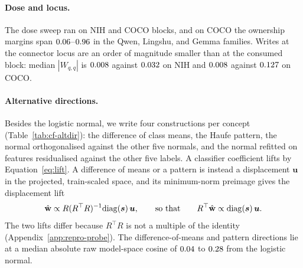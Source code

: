 \documentclass{article}
\begin{document}
\paragraph{Dose and locus.} The dose sweep ran on \cfDoseBlocksNih{} NIH and \cfDoseBlocksCoco{} COCO blocks, and on COCO the ownership margins span $0.06$--$0.96$ in the Qwen, Lingshu, and Gemma families. Writes at the connector locus are an order of magnitude smaller than at the consumed block: median $|W_{q,q}|$ is $0.008$ against $0.032$ on NIH and $0.008$ against $0.127$ on COCO.

\paragraph{Alternative directions.} Besides the logistic normal, we write four constructions per concept (Table~\ref{tab:cf-altdir}): the difference of class means, the Haufe pattern, the normal orthogonalised against the other five normals, and the normal refitted on features residualised against the other five labels. A classifier coefficient lifts by Equation~\ref{eq:lift}. A difference of means or a pattern is instead a displacement $\boldsymbol u$ in the projected, train-scaled space, and its minimum-norm preimage gives the displacement lift
\begin{equation}
\hat{\mathbf{w}}\propto R(R^{\top}R)^{-1}\mathrm{diag}(\boldsymbol s)\,\boldsymbol u,\qquad\text{so that}\qquad R^{\top}\hat{\mathbf{w}}\propto\mathrm{diag}(\boldsymbol s)\,\boldsymbol u .
\label{eq:displacement-lift}
\end{equation}
The two lifts differ because $R^{\top}R$ is not a multiple of the identity (Appendix~\ref{app:repro-probe}). The difference-of-means and pattern directions lie at a median absolute raw model-space cosine of $0.04$ to $0.28$ from the logistic normal.
\end{document}

